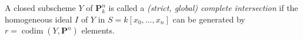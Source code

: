 A closed subscheme $Y$ of $\mathbf{P}_k^n$ is called a \emph{(strict, global) complete intersection} if the homogeneous ideal $I$ of $Y$ in $S = k[x_0, \ldots, x_n]$ can be generated by $r = \operatorname{codim}(Y, \mathbf{P}^n)$ elements.
